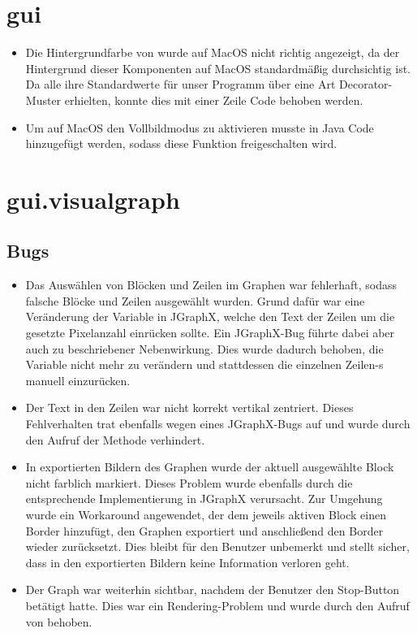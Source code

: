 \section{gui}

\begin{itemize}
	\item Die Hintergrundfarbe von  wurde auf MacOS nicht richtig angezeigt, da der Hintergrund dieser Komponenten auf MacOS standardmäßig durchsichtig ist. 
	Da alle  ihre Standardwerte für unser Programm über eine Art Decorator-Muster erhielten, konnte dies mit einer Zeile Code behoben werden.  
	\item Um auf MacOS den Vollbildmodus zu aktivieren musste in Java Code hinzugefügt werden, sodass diese Funktion freigeschalten wird.
\end{itemize}


\section{gui.visualgraph}

\subsection{Bugs}

\begin{itemize}
  \item Das Auswählen von Blöcken und Zeilen im Graphen war fehlerhaft, sodass falsche Blöcke und Zeilen ausgewählt wurden.
        Grund dafür war eine Veränderung der Variable  in JGraphX, welche den Text der Zeilen um die gesetzte Pixelanzahl einrücken sollte.
        Ein JGraphX-Bug führte dabei aber auch zu beschriebener Nebenwirkung.
        Dies wurde dadurch behoben, die Variable nicht mehr zu verändern und stattdessen die einzelnen Zeilen-s manuell einzurücken.
  \item Der Text in den Zeilen war nicht korrekt vertikal zentriert.
        Dieses Fehlverhalten trat ebenfalls wegen eines JGraphX-Bugs auf und wurde durch den Aufruf der Methode  verhindert.
  \item In exportierten Bildern des Graphen wurde der aktuell ausgewählte Block nicht farblich markiert.
        Dieses Problem wurde ebenfalls durch die entsprechende Implementierung in JGraphX verursacht.
        Zur Umgehung wurde ein Workaround angewendet, der dem jeweils aktiven Block einen Border hinzufügt, den Graphen exportiert und anschließend den Border wieder zurücksetzt.
        Dies bleibt für den Benutzer unbemerkt und stellt sicher, dass in den exportierten Bildern keine Information verloren geht.
  \item Der Graph war weiterhin sichtbar, nachdem der Benutzer den Stop-Button betätigt hatte.
        Dies war ein Rendering-Problem und wurde durch den Aufruf von  behoben.
\end{itemize}

